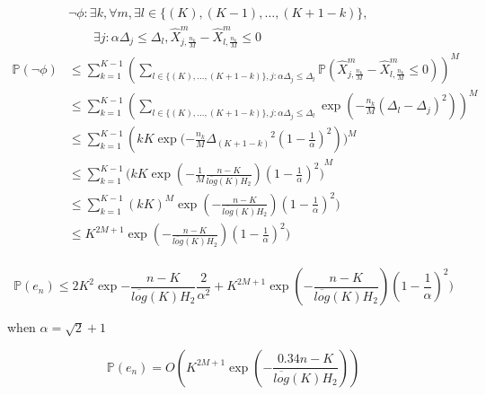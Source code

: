 \documentclass{sig-alternate}
\newcommand{\pr}[1]{\ensuremath{\mathbb{P}{(#1)}}}
\newcommand{\meanp}[3]{\ensuremath{\hat{X}_{#1,#2}^{#3}}}
\newcommand{\delmean}[1]{\ensuremath{\Delta_{#1}}}
\begin{document}
\begin{equation*}
\begin{aligned}
& \neg\phi: \exists k,\forall m, \exists l\in \{(K), (K-1),\ldots,(K+1-k)\}, \\
&\quad\quad \exists j:\alpha\delmean{j}\leq\delmean{l},  \meanp{j}{\frac{n_k}{M}}{m}  - \meanp{l}{\frac{n_k}{M}}{m}\leq 0\\
\pr{\neg\phi} &\leq  \sum_{k=1}^{K-1} (\sum_{l\in \{(K),\ldots,(K+1-k)\}, j: \alpha\delmean{j} \leq \delmean{l}} \pr{\meanp{j}{\frac{n_k}{M}}{m} - \meanp{l}{\frac{n_k}{M}}{m} \leq 0})^{M} \\
&\leq \sum_{k=1}^{K-1} (\sum_{l\in \{(K),\ldots,(K+1-k)\}, j: \alpha\delmean{j} \leq \delmean{l}} \exp{(-\frac{n_k}{M}{(\delmean{l}-\delmean{j})}^2)})^{M}\\
&\leq \sum_{k=1}^{K-1} (kK \exp{(-\frac{n_k}{M}\delmean{(K+1-k)}^2}(1-\frac{1}{\alpha})^2))^{M} \\
&\leq \sum_{k=1}^{K-1} (kK \exp{(-\frac{1}{M}\frac{n-K}{\overline{log}(K)H_2})(1-\frac{1}{\alpha})^2)}^{M}\\
&\leq \sum_{k=1}^{K-1} (kK)^{M} \exp{(-\frac{n-K}{\overline{log}(K)H_2})(1-\frac{1}{\alpha})^2)} \\
&\leq K^{2M+1} \exp{(-\frac{n-K}{\overline{log}(K)H_2})(1-\frac{1}{\alpha})^2)}\\
\end{aligned}
\end{equation*}

\[
\pr{e_n} \leq 2K^2 \exp{-\frac{n-K}{\overline{log}(K)H_2}\frac{2}{\alpha^2}} + K^{2M+1} \exp{(-\frac{n-K}{\overline{log}(K)H_2})(1-\frac{1}{\alpha})^2)}
\]

when $\alpha = \sqrt{2}+1$

\[
\pr{e_n} = O(K^{2M+1} \exp{(-\frac{0.34n-K}{\overline{log}(K)H_2})})
\]
\end{document}
